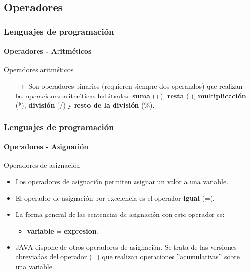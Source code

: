 \documentclass{beamer}
\begin{document}
\subsection{Operadores}

\begin{frame}
  \frametitle{Lenguajes de programación} 
  \framesubtitle{Operadores - Aritméticos}

  \begin{block}{Operadores aritméticos}
    \begin{itemize}
    \item[$\rightarrow$] Son operadores binarios (requieren siempre dos operandos) que realizan las operaciones aritméticas habituales: \textbf{suma} (+), \textbf{resta} (-), \textbf{multiplicación} (*), \textbf{división} (/) y \textbf{resto de la división} (\%).
    \end{itemize}
  \end{block}
\end{frame}

\begin{frame}
  \frametitle{Lenguajes de programación} 
  \framesubtitle{Operadores - Asignación}

  \begin{block}{Operadores de asignación}
    \begin{itemize}
    \item Los operadores de asignación permiten asignar un valor a una variable.
    \item El operador de asignación por excelencia es el operador \textbf{igual} (=). 
    \item La forma general de las sentencias de asignación con este operador es:
      \begin{itemize}
      \item \textbf{variable} = \textbf{expresion};
      \end{itemize}
    \item JAVA dispone de otros operadores de asignación. Se trata de las versiones abreviadas del operador (=) que realizan operaciones ''acumulativas'' sobre una variable.
    \end{itemize}
  \end{block}
\end{frame}
\end{document}
